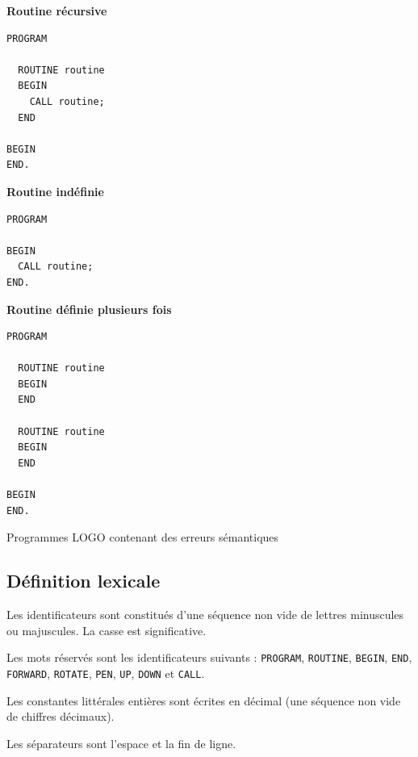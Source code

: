 \begin{table}[t]
  \centering
  \small

\begin{multicols}{3}

\textbf{Routine récursive}

\begin{lstlisting}
PROGRAM

  ROUTINE routine
  BEGIN
    CALL routine;
  END
  
BEGIN
END.
\end{lstlisting}

\columnbreak

\textbf{Routine indéfinie}

\begin{lstlisting}
PROGRAM

BEGIN
  CALL routine;
END.
\end{lstlisting}

\columnbreak
\textbf{Routine définie plusieurs fois}

\begin{lstlisting}
PROGRAM

  ROUTINE routine
  BEGIN
  END
  
  ROUTINE routine
  BEGIN
  END
  
BEGIN
END.
\end{lstlisting}

\end{multicols}

  \caption{Programmes LOGO contenant des erreurs sémantiques}
  \ligne
\end{table}

\subsection{Définition lexicale}

Les identificateurs sont constitués d'une séquence non vide de lettres minuscules ou majuscules. La casse est significative.

Les mots réservés sont les identificateurs suivants : \texttt{PROGRAM}, \texttt{ROUTINE}, \texttt{BEGIN}, \texttt{END}, \texttt{FORWARD}, \texttt{ROTATE}, \texttt{PEN}, \texttt{UP}, \texttt{DOWN} et \texttt{CALL}.

Les constantes littérales entières sont écrites en décimal (une séquence non vide de chiffres décimaux).

Les séparateurs sont l'espace et la fin de ligne.

